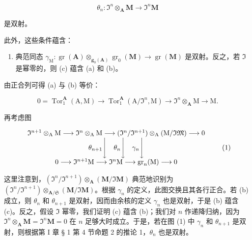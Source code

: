 \[
\theta_ {n} \colon \mathfrak {I} ^ {n} \otimes_ {\mathbf {A}} \mathbf {M} \rightarrow \mathfrak {I} ^ {n} \mathbf {M}
\]

是双射。

此外，这些条件蕴含：

\begin{enumerate}
\def\labelenumi{(\alph{enumi})}
\setcounter{enumi}{2}
\tightlist
\item
  典范同态 \(\gamma_{\mathrm{M}}: \operatorname{gr}(\mathbf{A}) \otimes_{\mathbf{g}_{0}(\mathbf{A})} \operatorname{gr}_{0}(\mathbf{M}) \to \operatorname{gr}(\mathbf{M})\) 是双射。反之，若 \(\Im\) 是幂零的，则 (c) 蕴含 (a) 和 (b)。
\end{enumerate}

由正合列可得 (a) 与 (b) 等价：

\[
0 = \operatorname{Tor} _ {1} ^ {\mathbf {A}} (\mathrm{A}, \mathrm{M}) \rightarrow \operatorname{Tor} _ {1} ^ {\mathbf {A}} (\mathrm{A} / \Im^ {n}, \mathrm{M}) \rightarrow \Im^ {n} \otimes_ {\mathbf {A}} \mathrm{M} \rightarrow \mathrm{M}.
\]

再考虑图

\[
\begin{array}{c} \mathfrak {I} ^ {n + 1} \otimes_ {\mathrm{A}} \mathrm{M} \longrightarrow \mathfrak {I} ^ {n} \otimes_ {\mathrm{A}} \mathrm{M} \longrightarrow (\mathfrak {I} ^ {n} / \mathfrak {I} ^ {n + 1}) \otimes_ {\mathrm{A}} (\mathrm{M} / \mathfrak {I M}) \longrightarrow 0 \\ \theta_ {n + 1} \Bigg \downarrow \quad \theta_ {n} \Bigg \downarrow \quad \gamma_ {n} \Bigg \downarrow \\ 0 \longrightarrow \mathfrak {I} ^ {n + 1} \mathrm{M} \longrightarrow \mathfrak {I} ^ {n} \mathrm{M} \longrightarrow \operatorname{gr} _ {n} (\mathrm{M}) \longrightarrow 0 \end{array}\tag{1}
\]

这里注意到，\((\mathfrak{I}^n / \mathfrak{I}^{n+1}) \otimes_{\mathbf{A}} (\mathbf{M} / \mathfrak{I}\mathbf{M})\) 典范地识别为 \((\mathfrak{I}^n / \mathfrak{I}^{n+1}) \otimes_{\mathbf{A} / \mathfrak{S}} (\mathbf{M} / \mathfrak{I}\mathbf{M})\)。根据 \(\gamma_n\) 的定义，此图交换且其各行正合。若 (b) 成立，则 \(\theta_n\) 和 \(\theta_{n+1}\) 是双射，因而由余核的定义 \(\gamma_n\) 也是双射，于是 (b) 蕴含 (c)。反之，假设 \(\mathfrak{I}\) 幂零，我们证明 (c) 蕴含 (b)；我们对 \(n\) 作递降归纳，因为 \(\mathfrak{I}^n \otimes_{\mathbf{A}} \mathbf{M} = \mathfrak{I}^n\mathbf{M} = 0\) 在 \(n\) 足够大时成立。于是，若在图 (1) 中 \(\gamma_n\) 和 \(\theta_{n+1}\) 是双射，则根据第 I 章 § 1 第 4 节命题 2 的推论 1，\(\theta_n\) 也是双射。


